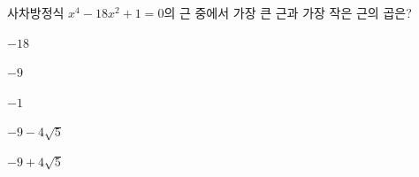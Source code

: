 사차방정식 $x^4-18x^2+1=0$의 근 중에서 가장 큰 근과 가장 작은 근의 곱은?
\begin{choices32}{\rule[-3ex]{0pt}{8ex}$-18$}{\rule[-3ex]{0pt}{8ex}$-9$}{\rule[-3ex]{0pt}{8ex}$-1$}{\rule[-3ex]{0pt}{8ex}$-9-4\sqrt{5}$}{\rule[-3ex]{0pt}{8ex}$-9+4\sqrt{5}$}\end{choices32}
